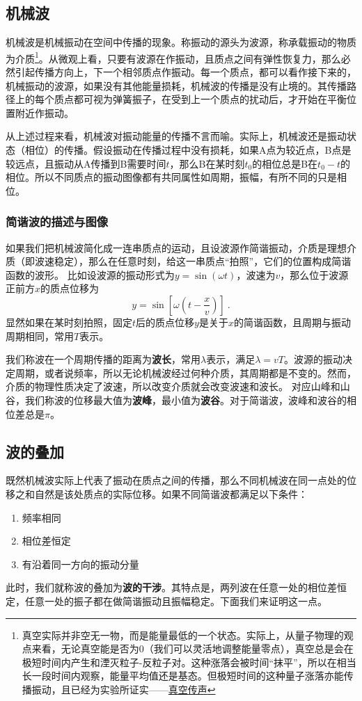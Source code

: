 
\subsection{机械波}
机械波是机械振动在空间中传播的现象。称振动的源头为波源，称承载振动的物质为介质\footnote{真空实际并非空无一物，而是能量最低的一个状态。实际上，从量子物理的观点来看，无论真空能是否为0（我们可以灵活地调整能量零点），真空总是会在极短时间内产生和湮灭粒子-反粒子对。这种涨落会被时间“抹平”，所以在相当长一段时间内观察，能量平均值还是基态。但极短时间的这种量子涨落亦能传播振动，且已经为实验所证实——\href{https://www.rmzxw.com.cn/c/2023-08-25/3399291.shtml}{真空传声}}。从微观上看，只要有波源在作振动，且质点之间有弹性恢复力，那么必然引起传播方向上，下一个相邻质点作振动。每一个质点，都可以看作接下来的，机械振动的波源，如果没有其他能量损耗，机械波的传播是没有止境的。其传播路径上的每个质点都可视为弹簧振子，在受到上一个质点的扰动后，才开始在平衡位置附近作振动。

从上述过程来看，机械波对振动能量的传播不言而喻。实际上，机械波还是振动状态（相位）的传播。假设振动在传播过程中没有损耗，如果A点为较近点，B点是较远点，且振动从A传播到B需要时间$t$，那么B在某时刻$t_0$的相位总是B在$t_0-t$的相位。所以不同质点的振动图像都有共同属性如周期，振幅，有所不同的只是相位。
\subsubsection{简谐波的描述与图像}
如果我们把机械波简化成一连串质点的运动，且设波源作简谐振动，介质是理想介质（即波速稳定），那么在任意时刻，给这一串质点“拍照”，它们的位置构成简谐函数的波形。
比如设波源的振动形式为$y=\sin(\omega t)$，波速为$v$，那么位于波源正前方$x$的质点位移为
\begin{equation}
y=\sin [\omega (t-\frac{x}{v})]~.
\end{equation}
显然如果在某时刻拍照，固定$t$后的质点位移$y$是关于$x$的简谐函数，且周期与振动周期相同，常用$T$表示。%

我们称波在一个周期传播的距离为\textbf{波长}，常用$\lambda $表示，满足$\lambda=vT$。波源的振动决定周期，或者说频率，所以无论机械波经过何种介质，其周期都是不变的。然而，介质的物理性质决定了波速，所以改变介质就会改变波速和波长。
对应山峰和山谷，我们称波的位移最大值为\textbf{波峰}，最小值为\textbf{波谷}。对于简谐波，波峰和波谷的相位差总是$\pi$。

\subsection{波的叠加}
既然机械波实际上代表了振动在质点之间的传播，那么不同机械波在同一点处的位移之和自然是该处质点的实际位移。如果不同简谐波都满足以下条件：
\begin{enumerate}
\item 频率相同
\item 相位差恒定
\item 有沿着同一方向的振动分量
\end{enumerate}
此时，我们就称波的叠加为\textbf{波的干涉}。其特点是，两列波在任意一处的相位差恒定，任意一处的振子都在做简谐振动且振幅稳定。下面我们来证明这一点。

